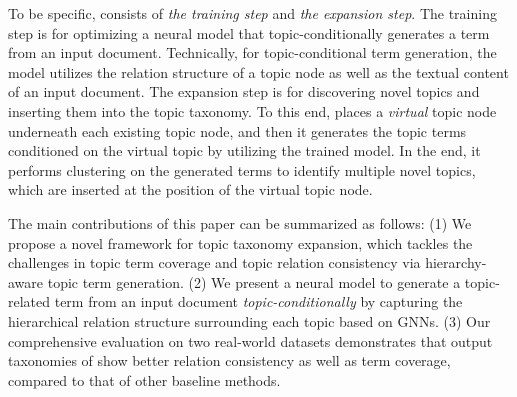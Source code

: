 To be specific, \proposed consists of \textit{the training step} and \textit{the expansion step}.
The training step is for optimizing a neural model that topic-conditionally generates a term from an input document.
Technically, for topic-conditional term generation, the model utilizes the relation structure of a topic node as well as the textual content of an input document.
The expansion step is for discovering novel topics and inserting them into the topic taxonomy.
To this end, \proposed places a \textit{virtual} topic node underneath each existing topic node, and then it generates the topic terms conditioned on the virtual topic by utilizing the trained model.
In the end, it performs clustering on the generated terms to identify multiple novel topics, which are inserted at the position of the virtual topic node.



The main contributions of this paper can be summarized as follows:
(1) We propose a novel framework for topic taxonomy expansion, which tackles the challenges in topic term coverage and topic relation consistency via hierarchy-aware topic term generation.
(2) We present a neural model to generate a topic-related term from an input document \textit{topic-conditionally} by capturing the hierarchical relation structure surrounding each topic based on GNNs.
(3) Our comprehensive evaluation on two real-world datasets demonstrates that output taxonomies of \proposed show better relation consistency as well as term coverage, compared to that of other baseline methods.
    
